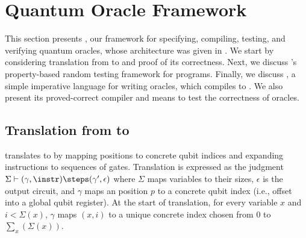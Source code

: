 \section{\name Quantum Oracle Framework}
\label{sec:implementation}

This section presents \name, our framework for specifying, compiling,
testing, and verifying quantum oracles, whose architecture was
given in . We start by considering translation
from \oqasm to \sqir and proof of its correctness. Next, we discuss \name's
property-based random testing framework for \oqasm
programs. Finally, we discuss \vqimp, a simple imperative language for
writing oracles, which compiles to \oqasm. We also present its proved-correct 
compiler and means to test the correctness of \vqimp oracles.

\subsection{Translation from \oqasm to \sqir}\label{sec:vqir-compilation}

\newcommand{\tget}{\texttt{get}}
\newcommand{\tstart}{\texttt{start}}
\newcommand{\tfst}{\texttt{fst}}
\newcommand{\tsnd}{\texttt{snd}}
\newcommand{\tucom}[1]{\texttt{ucom}~{#1}}
\newcommand{\tif}{\texttt{if}}
\newcommand{\tthen}{\texttt{then}}
\newcommand{\telse}{\texttt{else}}
\newcommand{\tlet}{\texttt{let}}
\newcommand{\tin}{\texttt{in}}

\name translates \oqasm to \sqir by mapping \oqasm positions to \sqir 
concrete qubit indices and expanding \oqasm instructions to sequences
of \sqir gates.
%
%
Translation is expressed as the judgment
$\Sigma\vdash (\gamma,\instr) \steps
(\gamma',\epsilon)$ where $\Sigma$ maps \oqasm variables to their sizes, 
$\epsilon$ is the output \sqir circuit, and $\gamma$ maps an \oqasm 
position $p$ to a \sqir concrete qubit index (i.e., offset into a 
global qubit register).  At the start of translation, for every
variable $x$ and $i < \Sigma(x)$, $\gamma$ maps $(x,i)$ to a unique
concrete index chosen from 0 to $\sum_{x}(\Sigma(x))$.

